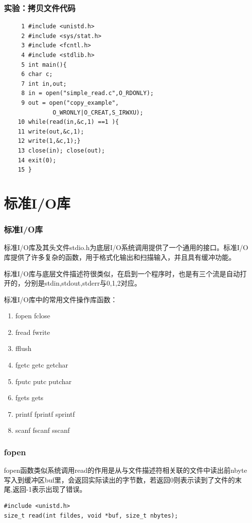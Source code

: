 \documentclass{beamer}
\begin{document}
\begin{frame}[fragile]
\frametitle{实验：拷贝文件代码}
\begin{lstlisting}
     1 #include <unistd.h>
     2 #include <sys/stat.h>
     3 #include <fcntl.h>
     4 #include <stdlib.h>
     5 int main(){
     6 char c;
     7 int in,out;
     8 in = open("simple_read.c",O_RDONLY);
     9 out = open("copy_example",
              O_WRONLY|O_CREAT,S_IRWXU);
    10 while(read(in,&c,1) ==1 ){
    11 write(out,&c,1);
    12 write(1,&c,1);}
    13 close(in); close(out);
    14 exit(0);
    15 }
\end{lstlisting}
\end{frame}

\section{标准I/O库}
\begin{frame}
\frametitle{标准I/O库}
标准I/O库及其头文件stdio.h为底层I/O系统调用提供了一个通用的接口。标准I/O库提供了许多复杂的函数，用于格式化输出和扫描输入，并且具有缓冲功能。

标准I/O库与底层文件描述符很类似，在启到一个程序时，也是有三个流是自动打开的，分别是stdin,stdout,stderr与0,1,2对应。

标准I/O库中的常用文件操作库函数：
\begin{enumerate}
\item
fopen	fclose
\item
fread		fwrite
\item
fflush
\item
fgetc		getc		getchar
\item
fputc		putc		putchar
\item
fgets		gets
\item
printf		fprintf	sprintf
\item
scanf	fscanf	sscanf
\end{enumerate}

\end{frame}
\begin{frame}[fragile]
\frametitle{fopen}
fopen函数类似系统调用read的作用是从与文件描述符相关联的文件中读出前nbyte写入到缓冲区buf里，会返回实际读出的字节数，若返回0则表示读到了文件的末尾,返回-1表示出现了错误。
\begin{example}[read系统调用的原型]
\begin{verbatim}
#include <unistd.h>
size_t read(int fildes, void *buf, size_t nbytes);
\end{verbatim}
\end{example}

\end{frame}
\end{document}
